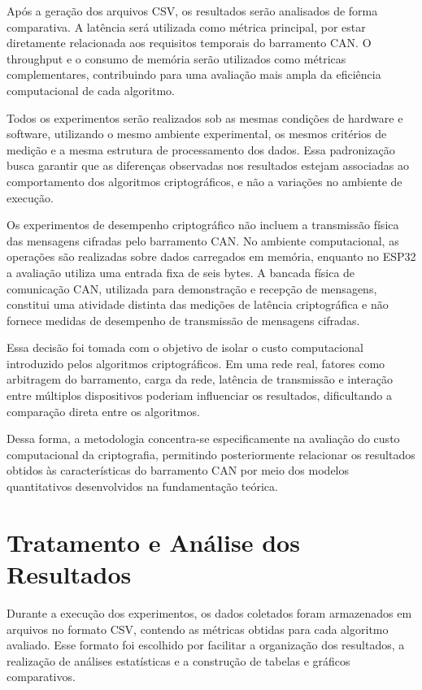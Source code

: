 Após a geração dos arquivos CSV, os resultados serão analisados de forma comparativa. A latência será utilizada como métrica principal, por estar diretamente relacionada aos requisitos temporais do barramento CAN. O throughput e o consumo de memória serão utilizados como métricas complementares, contribuindo para uma avaliação mais ampla da eficiência computacional de cada algoritmo.

Todos os experimentos serão realizados sob as mesmas condições de hardware e software, utilizando o mesmo ambiente experimental, os mesmos critérios de medição e a mesma estrutura de processamento dos dados. Essa padronização busca garantir que as diferenças observadas nos resultados estejam associadas ao comportamento dos algoritmos criptográficos, e não a variações no ambiente de execução.

Os experimentos de desempenho criptográfico não incluem a transmissão física das mensagens cifradas pelo barramento CAN. No ambiente computacional, as operações são realizadas sobre dados carregados em memória, enquanto no ESP32 a avaliação utiliza uma entrada fixa de seis bytes. A bancada física de comunicação CAN, utilizada para demonstração e recepção de mensagens, constitui uma atividade distinta das medições de latência criptográfica e não fornece medidas de desempenho de transmissão de mensagens cifradas.

Essa decisão foi tomada com o objetivo de isolar o custo computacional introduzido pelos algoritmos criptográficos. Em uma rede real, fatores como arbitragem do barramento, carga da rede, latência de transmissão e interação entre múltiplos dispositivos poderiam influenciar os resultados, dificultando a comparação direta entre os algoritmos.

Dessa forma, a metodologia concentra-se especificamente na avaliação do custo computacional da criptografia, permitindo posteriormente relacionar os resultados obtidos às características do barramento CAN por meio dos modelos quantitativos desenvolvidos na fundamentação teórica.

\section{Tratamento e Análise dos Resultados}

Durante a execução dos experimentos, os dados coletados foram armazenados em arquivos no formato CSV, contendo as métricas obtidas para cada algoritmo avaliado. Esse formato foi escolhido por facilitar a organização dos resultados, a realização de análises estatísticas e a construção de tabelas e gráficos comparativos.



